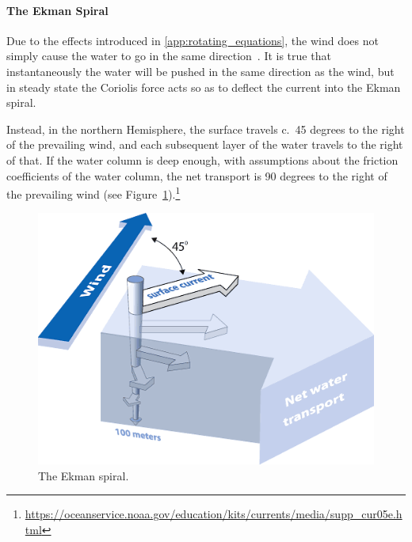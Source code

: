 \paragraph{The Ekman Spiral}

Due to the effects introduced in \cref{app:rotating_equations},
the wind does not simply cause the water to go in
the same direction~\cite{ekman1905influence}.
It is true that instantaneously the water will be pushed in the same
direction as the wind, but in steady state the Coriolis force acts
so as to deflect the current into the Ekman spiral.

Instead, in the northern Hemisphere,
 the surface travels c.~45 degrees to the
right of the prevailing wind, and each subsequent
layer of the water travels to the right of that.
If the water column is deep enough, with
assumptions about the friction coefficients of the water column,
the net transport is 90 degrees to the right of the prevailing wind
(see Figure~\ref{fig:ekman}).\footnote{
\url{https://oceanservice.noaa.gov/education/kits/currents/media/supp_cur05e.html}}

\begin{figure}
\includegraphics[width=\linewidth]{images/ekman_spiral.png}
\caption{The Ekman spiral.}
\label{fig:ekman}
\end{figure}
